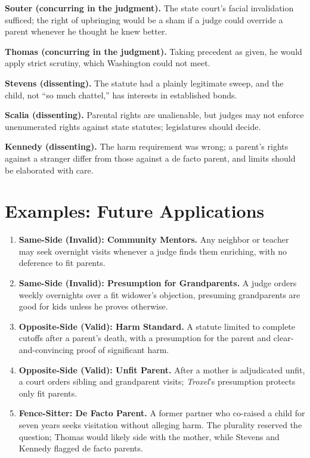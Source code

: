 \documentclass[12pt]{article}
\begin{document}
\textbf{Souter (concurring in the judgment).} The state court's facial invalidation sufficed; the right of upbringing would be a sham if a judge could override a parent whenever he thought he knew better.

\textbf{Thomas (concurring in the judgment).} Taking precedent as given, he would apply strict scrutiny, which Washington could not meet.

\textbf{Stevens (dissenting).} The statute had a plainly legitimate sweep, and the child, not ``so much chattel,'' has interests in established bonds.

\textbf{Scalia (dissenting).} Parental rights are unalienable, but judges may not enforce unenumerated rights against state statutes; legislatures should decide.

\textbf{Kennedy (dissenting).} The harm requirement was wrong; a parent's rights against a stranger differ from those against a de facto parent, and limits should be elaborated with care.

\section{Examples: Future Applications}

\begin{enumerate}
\item \textbf{Same-Side (Invalid): Community Mentors.} Any neighbor or teacher may seek overnight visits whenever a judge finds them enriching, with no deference to fit parents.
\item \textbf{Same-Side (Invalid): Presumption for Grandparents.} A judge orders weekly overnights over a fit widower's objection, presuming grandparents are good for kids unless he proves otherwise.
\item \textbf{Opposite-Side (Valid): Harm Standard.} A statute limited to complete cutoffs after a parent's death, with a presumption for the parent and clear-and-convincing proof of significant harm.
\item \textbf{Opposite-Side (Valid): Unfit Parent.} After a mother is adjudicated unfit, a court orders sibling and grandparent visits; \textit{Troxel}'s presumption protects only fit parents.
\item \textbf{Fence-Sitter: De Facto Parent.} A former partner who co-raised a child for seven years seeks visitation without alleging harm. The plurality reserved the question; Thomas would likely side with the mother, while Stevens and Kennedy flagged de facto parents.
\end{enumerate}
\end{document}
